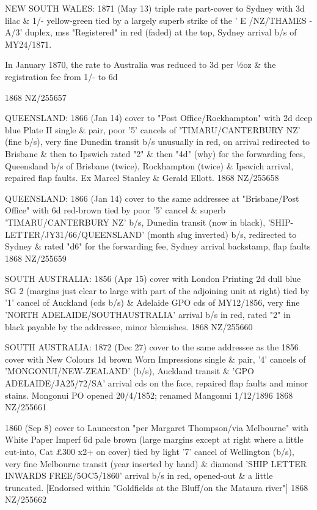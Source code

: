 \documentclass[justified]{tufte-book}
\begin{document}
%
{NEW SOUTH WALES: 1871 (May 13) triple rate part-cover to Sydney with 3d lilac \& 1/- yellow-green tied by a largely superb strike of the ' E /NZ/THAMES - A/3' duplex, mss "Registered" in red (faded) at the top, Sydney arrival b/s of MY24/1871. 

In January 1870, the rate to Australia was reduced to 3d per ½oz \& the registration fee from 1/- to 6d}%
{1868}%
{NZ/255657}%
{}%
{}
{}%
{}


%
{QUEENSLAND: 1866 (Jan 14) cover to "Post Office/Rockhampton" with 2d deep blue Plate II single \& pair, poor '5' cancels of 'TIMARU/CANTERBURY NZ' (fine b/s), very fine Dunedin transit b/s unusually in red, on arrival redirected to Brisbane \& then to Ipswich rated "2" \& then "4d" (why) for the forwarding fees, Queensland b/s of Brisbane (twice), Rockhampton (twice) \& Ipswich arrival, repaired flap faults. Ex Marcel Stanley \& Gerald Ellott.}%
{1868}%
{NZ/255658}%
{}%
{}
{}%
{}

%
{QUEENSLAND: 1866 (Jan 14) cover to the same addressee at "Brisbane/Post Office" with 6d red-brown tied by poor '5' cancel \& superb 'TIMARU/CANTERBURY NZ' b/s, Dunedin transit (now in black), 'SHIP-LETTER/JY31/66/QUEENSLAND' (month slug inverted) b/s, redirected to Sydney \& rated "d6" for the forwarding fee, Sydney arrival backstamp, flap faults}%
{1868}%
{NZ/255659}%
{}%
{}
{}%
{}

%
{SOUTH AUSTRALIA: 1856 (Apr 15) cover with London Printing 2d dull blue SG 2 (margins just clear to large with part of the adjoining unit at right) tied by '1' cancel of Auckland (cds b/s) \& Adelaide GPO cds of MY12/1856, very fine 'NORTH ADELAIDE/SOUTHAUSTRALIA' arrival b/s in red, rated "2" in black payable by the addressee, minor blemishes.}%
{1868}%
{NZ/255660}%
{}%
{}
{}%
{}

%
{SOUTH AUSTRALIA: 1872 (Dec 27) cover to the same addressee as the 1856 cover with New Colours 1d brown Worn Impressions single \& pair, '4' cancels of 'MONGONUI/NEW-ZEALAND' (b/s), Auckland transit \& 'GPO ADELAIDE/JA25/72/SA' arrival cds on the face, repaired flap faults and minor stains. Mongonui PO opened 20/4/1852; renamed Mangonui 1/12/1896}%
{1868}%
{NZ/255661}%
{}%
{}
{}%
{}

%
{1860 (Sep 8) cover to Launceston "per Margaret Thompson/via Melbourne" with White Paper Imperf 6d pale brown (large margins except at right where a little cut-into, Cat £300 x2+ on cover) tied by light '7' cancel of Wellington (b/s), very fine Melbourne transit (year inserted by hand) \& diamond 'SHIP LETTER INWARDS FREE/5OC5/1860' arrival b/s in red, opened-out \& a little truncated. [Endorsed within "Goldfields at the Bluff/on the Mataura river"]}%
{1868}%
{NZ/255662}%
{}%
{}
{}%
{}
\end{document}
